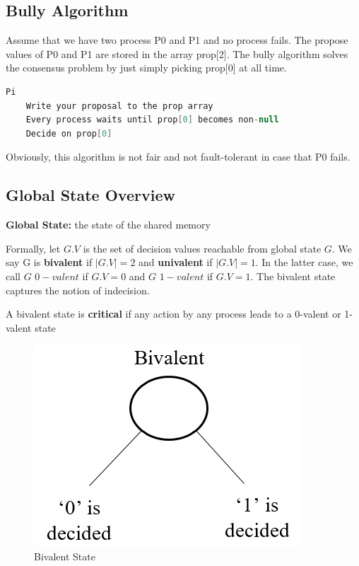 \documentclass[twoside]{article}
\begin{document}
\subsection{Bully Algorithm}

Assume that we have two process P0 and P1 and no process fails. The propose values of P0 and P1 are stored in the array prop[2]. The bully algorithm solves the consensus problem by just simply picking prop[0] at all time.

\begin{center}
\renewcommand{\lstlistingname}{Consensus}
\begin{lstlisting}[language=Java, caption=Bully Algorithm, frame=single, basicstyle=\small]
Pi
    Write your proposal to the prop array
    Every process waits until prop[0] becomes non-null
    Decide on prop[0]
\end{lstlisting}
\end{center}

Obviously, this algorithm is not fair and not fault-tolerant in case that P0 fails.

\subsection{Global State Overview}
\textbf{Global State:} the state of the shared memory

Formally, let $G.V$ is the set of decision values reachable from global state $G$. We say G is \textbf{bivalent} if $|G.V| = 2$ and \textbf{univalent} if $|G.V| = 1$. In the latter case, we call $G$ $0-valent$ if $G.V = {0}$ and $G$ $1-valent$ if $G.V = {1}$. The bivalent state captures the notion of indecision.

A bivalent state is \textbf{critical} if any action by any process leads to a 0-valent or 1-valent state

\begin{figure}[H]
    \centering
    \includegraphics[scale=0.75]{bivalent.png}
    \caption{Bivalent State}
    \label{fig:5}
\end{figure}
\end{document}
